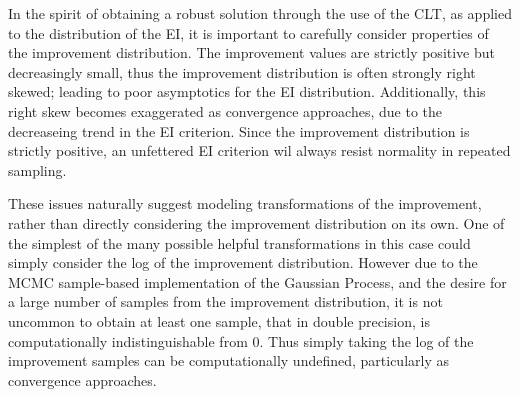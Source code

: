 \documentclass[12pt]{article}
\begin{document}
%
In the spirit of obtaining a robust solution through the use of the CLT, as applied to the distribution of the EI, it is important to carefully consider properties of the improvement distribution.
%
The improvement values are strictly positive but decreasingly small, thus the improvement distribution is often strongly right skewed; leading to poor asymptotics for the EI distribution.
%
Additionally, this right skew becomes exaggerated as convergence approaches, due to the decreaseing trend in the EI criterion.
Since the improvement distribution is strictly positive, an unfettered EI criterion wil always resist normality in repeated sampling. 
%
 
%
%

These issues naturally suggest modeling transformations of the improvement, rather than directly considering the improvement distribution on its own.
%
One of the simplest of the many possible helpful transformations in this case could simply consider the log of the improvement distribution. 
%
However due to the MCMC sample-based implementation of the Gaussian Process, and the desire for a large number of samples from the improvement distribution, it is not uncommon to obtain at least one sample, that in double precision, is computationally indistinguishable from 0.
%
Thus simply taking the log of the improvement samples can be computationally undefined, particularly as convergence approaches.

%
%
\end{document}
